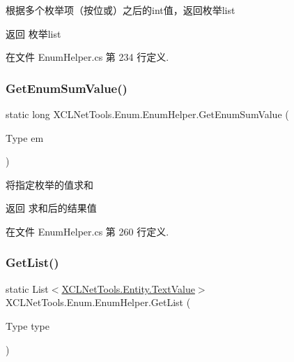 根据多个枚举项（按位或）之后的int值，返回枚举list 

\begin{DoxyReturn}{返回}
枚举list
\end{DoxyReturn}


在文件 Enum\+Helper.\+cs 第 234 行定义.

\mbox{\label{class_x_c_l_net_tools_1_1_enum_1_1_enum_helper_a43bf704153939cd6950d5d88e072c691}} 
\subsubsection{\texorpdfstring{Get\+Enum\+Sum\+Value()}{GetEnumSumValue()}}
{\footnotesize\ttfamily static long X\+C\+L\+Net\+Tools.\+Enum.\+Enum\+Helper.\+Get\+Enum\+Sum\+Value (\begin{DoxyParamCaption}\item[{Type}]{em }\end{DoxyParamCaption})\hspace{0.3cm}{\ttfamily [static]}}



将指定枚举的值求和 

\begin{DoxyReturn}{返回}
求和后的结果值
\end{DoxyReturn}


在文件 Enum\+Helper.\+cs 第 260 行定义.

\mbox{\label{class_x_c_l_net_tools_1_1_enum_1_1_enum_helper_a0f98e6348aacd00a6254794e6565c173}} 
\subsubsection{\texorpdfstring{Get\+List()}{GetList()}}
{\footnotesize\ttfamily static List$<$\hyperlink{class_x_c_l_net_tools_1_1_entity_1_1_text_value}{X\+C\+L\+Net\+Tools.\+Entity.\+Text\+Value}$>$ X\+C\+L\+Net\+Tools.\+Enum.\+Enum\+Helper.\+Get\+List (\begin{DoxyParamCaption}\item[{Type}]{type }\end{DoxyParamCaption})\hspace{0.3cm}{\ttfamily [static]}}



